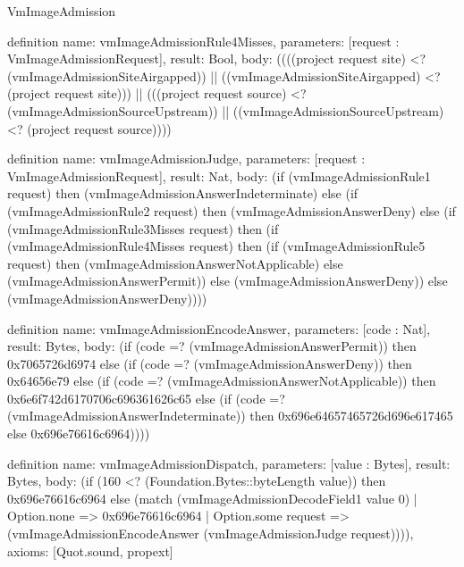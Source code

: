 \begin{lexlean}{VmImageAdmission}
\begin{semanticmodule}
definition{
  name: vmImageAdmissionRule4Misses,
  parameters: [request : VmImageAdmissionRequest],
  result: Bool,
  body: ((((project request site) <? (vmImageAdmissionSiteAirgapped)) || ((vmImageAdmissionSiteAirgapped) <? (project request site))) || (((project request source) <? (vmImageAdmissionSourceUpstream)) || ((vmImageAdmissionSourceUpstream) <? (project request source))))
}

definition{
  name: vmImageAdmissionJudge,
  parameters: [request : VmImageAdmissionRequest],
  result: Nat,
  body: (if (vmImageAdmissionRule1 request) then (vmImageAdmissionAnswerIndeterminate) else (if (vmImageAdmissionRule2 request) then (vmImageAdmissionAnswerDeny) else (if (vmImageAdmissionRule3Misses request) then (if (vmImageAdmissionRule4Misses request) then (if (vmImageAdmissionRule5 request) then (vmImageAdmissionAnswerNotApplicable) else (vmImageAdmissionAnswerPermit)) else (vmImageAdmissionAnswerDeny)) else (vmImageAdmissionAnswerDeny))))
}

definition{
  name: vmImageAdmissionEncodeAnswer,
  parameters: [code : Nat],
  result: Bytes,
  body: (if (code =? (vmImageAdmissionAnswerPermit)) then 0x7065726d6974 else (if (code =? (vmImageAdmissionAnswerDeny)) then 0x64656e79 else (if (code =? (vmImageAdmissionAnswerNotApplicable)) then 0x6e6f742d6170706c696361626c65 else (if (code =? (vmImageAdmissionAnswerIndeterminate)) then 0x696e64657465726d696e617465 else 0x696e76616c6964))))
}

definition{
  name: vmImageAdmissionDispatch,
  parameters: [value : Bytes],
  result: Bytes,
  body: (if (160 <? (Foundation.Bytes::byteLength value)) then 0x696e76616c6964 else (match (vmImageAdmissionDecodeField1 value 0)
    | Option.none => 0x696e76616c6964
    | Option.some request => (vmImageAdmissionEncodeAnswer (vmImageAdmissionJudge request)))),
  axioms: [Quot.sound, propext]
}
\end{semanticmodule}
\end{lexlean}
